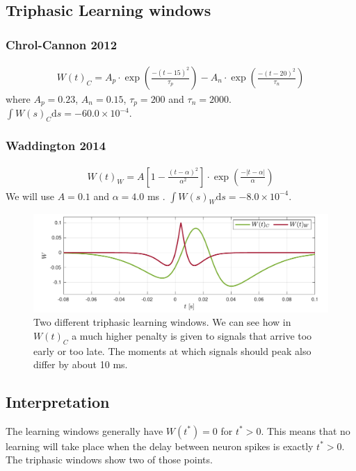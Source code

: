 \subsection{Triphasic Learning windows}

\subsubsection{Chrol-Cannon 2012}
\begin{align}
W(t)_C = A_{p} \cdot \exp \left(\frac{-\left(t - 15 \right)^{2}}{ \tau_{p}}\right) - A_{n} \cdot \exp \left(\frac{-\left(t - 20\right)^{2}}{ \tau_{n}}\right)  \label{eq:learningwindowChrolCannon2012}
\end{align}
where $A_{p}=0.23$, $A_{n}=0.15$, $\tau_{p}=200$ and $\tau_n = 2000$. $\int W(s)_C \mathrm{d}s = -60.0 \times 10^{-4}$.

\subsubsection{Waddington 2014}
\begin{align}
W(t)_W =  A \left[1-\frac{\left(t-\alpha\right)^{2}}{\alpha^{2}}\right] \cdot \exp \left(\frac{-\left|t - \alpha\right|}{\alpha}\right) \label{eq:learningwindowWaddington2014}
\end{align}
We will use $A = 0.1$ and $\alpha = 4.0$ ms . $\int W(s)_W \mathrm{d}s = -8.0 \times 10^{-4}$.

\begin{figure}[H]
\centering
\includegraphics[width = \textwidth]{../Figures/LearningWindowsTriphasic.pdf}
\caption{Two different triphasic learning windows. We can see how in $W(t)_C$  a much higher penalty is given to signals that arrive too early or too late. The moments at which signals should peak also differ by about 10 ms.}
\label{fig:LearningWindowsTriphasic}
\end{figure}


\subsection{Interpretation}
The learning windows generally have $W(t^{\ast}) = 0$ for $t^{\ast} > 0$. This means that no learning will take place when the delay between neuron spikes is exactly $t^{\ast} > 0$. The triphasic windows show two of those points.

